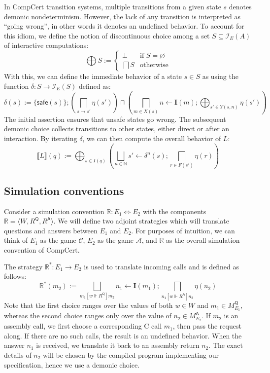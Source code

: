 \documentclass[format=sigplan,authordraft]{acmart}
\newcommand{\kw}[1]{\ensuremath{\mathsf{#1}}}
\newcommand{\ifr}[1]{\mathrel{[{#1}]}}
\begin{document}
In CompCert transition systems,
multiple transitions from a given state $s$
denotes demonic nondeterminism.
However,
the lack of any transition is interpreted as ``going wrong'',
in other words it denotes an undefined behavior.
To account for this idiom,
we define the notion of discontinuous choice among
a set $S \subseteq \mathcal{I}_E(A)$ of interactive computations:
\[
    \bigoplus S :=
    \begin{cases}
      \bot & \mbox{if } S = \varnothing \\
      \bigsqcap S & \mbox{otherwise}
    \end{cases}
\]
With this,
we can define the immediate behavior of a state $s \in S$ as
using the function $\delta : S \rightarrow \mathcal{I}_E(S)$
defined as:
\[
  \delta(s) :=
    \{ \kw{safe}(s) \} ;
    \left( \bigsqcap_{s \rightarrow s'} \eta(s') \right)
    \sqcap
    \left( \bigsqcap_{m \in X(s)} n \leftarrow \mathbf{I}(m) ;
            \bigoplus_{s' \in Y(s, n)} \eta(s') \right)
\]
The initial assertion ensures that unsafe states go wrong.
The subsequent demonic choice
collects transitions to other states,
either direct or after an interaction.
By iterating $\delta$, we can then compute the overall behavior of $L$:
\[
   \llbracket L \rrbracket (q) :=
     \bigoplus_{s \in I(q)}
     \left(
     \bigsqcup_{n \in \mathbb{N}}
     s' \leftarrow \delta^n(s) ; \bigsqcap_{r \in F(s')} \eta(r)
     \right)
\]


\subsection{Simulation conventions} %

Consider a simulation convention $\mathbb{R} : E_1 \Leftrightarrow E_2$
with the components $\mathbb{R} = \langle W, R^\kw{Q}, R^\kw{A} \rangle$.
We will define two adjoint strategies
which will translate questions and answers between
$E_1$ and $E_2$.
For purposes of intuition,
we can think of $E_1$ as the game $\mathcal{C}$,
$E_2$ as the game $\mathcal{A}$,
and $\mathbb{R}$ as the overall simulation convention of CompCert.

The strategy $\mathbb{R}^* : E_1 \rightarrow E_2$
is used to translate incoming calls
and is defined as follows:
\[
    \mathbb{R}^*(m_2) :=
       \bigsqcup_{m_1 \ifr{w \Vdash R^\kw{Q}} m_2}
       n_1 \leftarrow \mathbf{I}(m_1) ;
       \bigsqcap_{n_1 \ifr{w \Vdash R^\kw{A}} n_2}
       \eta(n_2)
\]
Note that the first choice ranges over the values of both
$w \in W$ and $m_1 \in M_{E_1}^\kw{Q}$,
whereas the second choice ranges only over the value of
$n_2 \in M_{E_2}^\kw{A}$.
If $m_2$ is an assembly call,
we first choose a corresponding C call $m_1$,
then pass the request along.
If there are no such calls,
the result is an undefined behavior.
When the answer $n_1$ is received,
we translate it back to an assembly return $n_2$.
The exact details of $n_2$ will be chosen by
the compiled program implementing our specification,
hence we use a demonic choice.
\end{document}
